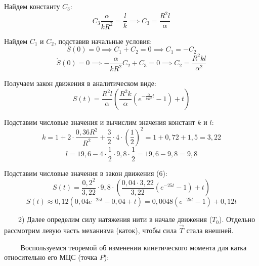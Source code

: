 \documentclass{article}
\begin{document}
\par
Найдем константу $C_3$:
\begin{equation*}
	C_3 \frac{\alpha}{k R^2} = \frac{l}{k} \implies C_3 = \frac{R^2l}{\alpha}
\end{equation*}
\par
Найдем $C_1$ и $C_2$, подставив начальные условия:
\begin{equation*}
	S(0) = 0 \implies C_1 + C_2 = 0 \implies C_1 = -C_2
\end{equation*}
\begin{equation*}
	\dot{S}(0) = 0 \implies -\frac{\alpha}{kR^2}C_2 + C_3 = 0 \implies C_2 = \frac{R^2kl}{\alpha^2}
\end{equation*}
\par
Получаем закон движения в аналитическом виде:
\begin{equation}
	S(t) = \frac{R^2l}{\alpha} \left( \frac{R^2 k}{\alpha} (e^{-\frac{\alpha}{k R^2} t} - 1) + t \right)
\end{equation}
\par
Подставим числовые значения и вычислим значения констант $k$ и $l$:
\begin{equation*}
	k = 1 + 2 \cdot \frac{0,36 R^2}{R^2} + \frac{3}{2} \cdot 4 \cdot \left(\frac{1}{2}\right)^2 = 1 + 0,72 + 1,5 = 3,22
\end{equation*}
\begin{equation*}
	l = 19,6 - 4 \cdot \frac{1}{2} \cdot 9,8 \cdot \frac{1}{2} = 19,6 - 9,8 = 9,8
\end{equation*}
\par
Подставим числовые значения в закон движения (6):
\begin{equation*}
	S(t) = \frac{0,2^2}{3,22} \cdot 9,8 \cdot \left( \frac{0,04 \cdot 3,22}{3,22} (e^{-25t} - 1) + t \right)
\end{equation*}
\begin{equation*}
	S(t) \approx 0,12 (0,04 e^{-25t} - 0,04 + t) = 0,0048 (e^{-25t} - 1) + 0,12 t
\end{equation*}
\newpage
\hspace{-1.2cm}
\begin{minipage}{0.4\textwidth}
\par
$\,\,\,\,\,\,\,\,\,\,\,\,$2) Далее определим силу натяжения нити в начале движения ($T_0$). Отдельно рассмотрим левую часть механизма (каток), чтобы сила $\vec{T}$ стала внешней. \par $\,\,\,\,\,\,\,\,\,\,\,\,$ Воспользуемся теоремой об изменении кинетического момента для катка относительно его МЦС (точка $P$):
\end{minipage}
\end{document}
